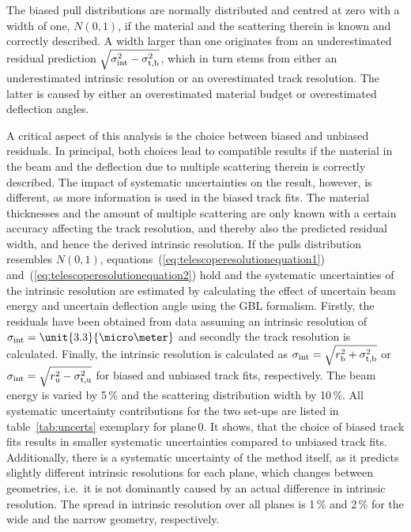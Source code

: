 \noindent
The biased pull distributions are normally distributed and centred at zero with a width of one, $N(0,1)$, if the material and the scattering therein is known and correctly described. 
A width larger than one originates from an underestimated residual prediction $\sqrt{\sigma_{\textrm{int}}^2 - \sigma_{\textrm{t,b}}^2}$, which in turn stems from either an underestimated intrinsic resolution
 or an overestimated track resolution. 
The latter is caused by either an overestimated material budget or overestimated deflection angles. 


A critical aspect of this analysis is the choice between biased and unbiased residuals. 
In principal, both choices lead to compatible results if the material in the beam and the deflection due to multiple scattering therein is correctly described. 
The impact of systematic uncertainties on the result, however, is different, as more information is used in the biased track fits. 
The material thicknesses and the amount of multiple scattering are only known with a certain accuracy affecting the track resolution, and thereby also the predicted residual width, 
 and hence the derived intrinsic resolution. 
If the pulls distribution resembles $N(0,1)$, equations~(\ref{eq:telescoperesolutionequation1}) and~(\ref{eq:telescoperesolutionequation2}) hold and the systematic uncertainties of the intrinsic resolution
 are estimated by calculating the effect of uncertain beam energy and uncertain deflection angle using the GBL formalism. 
Firstly, the residuals have been obtained from data assuming an intrinsic resolution of $\sigmai = \unit{3.3}{\micro\meter}$ and secondly the track resolution is calculated. 
Finally, the intrinsic resolution is calculated as $\sigma_{\textrm{int}} = \sqrt{r_{\textrm{b}}^2 + \sigma_{\textrm{t,b}}^2}$ or $\sigma_{\textrm{int}} = \sqrt{r_{\textrm{u}}^2 - \sigma_{\textrm{t,u}}^2}$ for biased and unbiased track fits, respectively. 
The beam energy is varied by 5\,\% and the scattering distribution width by 10\,\%. 
All systematic uncertainty contributions for the two set-ups are listed in table~\ref{tab:uncerts} exemplary for plane\,0.
It shows, that the choice of biased track fits results in smaller systematic uncertainties compared to unbiased track fits. 
Additionally, there is a systematic uncertainty of the method itself, as it predicts slightly different intrinsic resolutions for each plane, which changes between geometries,
 i.e.\ it is not dominantly caused by an actual difference in intrinsic resolution. 
The spread in intrinsic resolution over all planes is 1\,\% and 2\,\% for the wide and the narrow geometry, respectively. 

